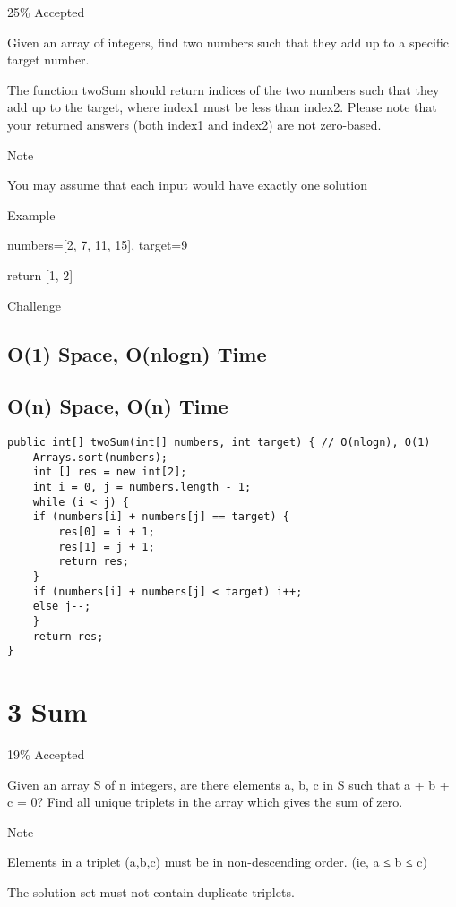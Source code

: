 \documentclass[12pt]{book}
\begin{document}
25\% Accepted

Given an array of integers, find two numbers such that they add up to a specific target number.

The function twoSum should return indices of the two numbers such that they add up to the target, where index1 must be less than index2. Please note that your returned answers (both index1 and index2) are not zero-based.

Note

You may assume that each input would have exactly one solution

Example

numbers=[2, 7, 11, 15], target=9

return [1, 2]

Challenge

\section{O(1) Space, O(nlogn) Time}
\label{sec-2-1}

\section{O(n) Space, O(n) Time}
\label{sec-2-2}
\lstset{language=java,label= ,caption= ,numbers=none}
\begin{lstlisting}
public int[] twoSum(int[] numbers, int target) { // O(nlogn), O(1)
    Arrays.sort(numbers);
    int [] res = new int[2];
    int i = 0, j = numbers.length - 1;
    while (i < j) {
	if (numbers[i] + numbers[j] == target) {
	    res[0] = i + 1;
	    res[1] = j + 1;
	    return res;
	}
	if (numbers[i] + numbers[j] < target) i++;
	else j--;
    }
    return res;
}
\end{lstlisting}

\chapter{3 Sum}
\label{sec-3}

19\% Accepted

Given an array S of n integers, are there elements a, b, c in S such that a + b + c = 0? Find all unique triplets in the array which gives the sum of zero.

Note

Elements in a triplet (a,b,c) must be in non-descending order. (ie, a ≤ b ≤ c)

The solution set must not contain duplicate triplets.
\end{document}
